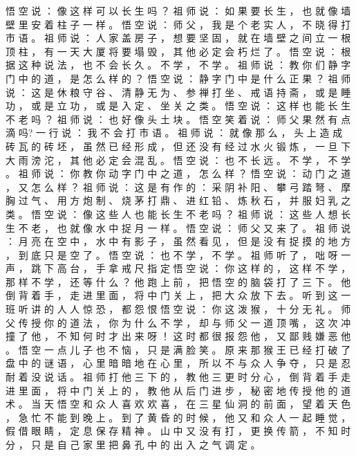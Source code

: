 {悟 空 说 ： 像 这 样 可 以 长 生 吗 ？ 祖 师 说 ： 如 果 要 长 生 ， 也 就 像 墙 壁 里 安 着 柱 子 一 样 。
悟 空 说 ： 师 父 ， 我 是 个 老 实 人 ， 不 晓 得 打 市 语 。
祖 师 说 ： 人 家 盖 房 子 ， 想 要 坚 固 ， 就 在 墙 壁 之 间 立 一 根 顶 柱 ， 有 一 天 大 厦 将 要 塌 毁 ， 其 他 必 定 会 朽 烂 了 。
悟 空 说 ： 根 据 这 种 说 法 ， 也 不 会 长 久 。
不 学 ， 不 学 。
祖 师 说 ： 教 你 们 静 字 门 中 的 道 ， 是 怎 么 样 的 ？ 悟 空 说 ： 静 字 门 中 是 什 么 正 果 ？ 祖 师 说 ： 这 是 休 粮 守 谷 、 清 静 无 为 、 参 禅 打 坐 、 戒 语 持 斋 ， 或 是 睡 功 ， 或 是 立 功 ， 或 是 入 定 、 坐 关 之 类 。
悟 空 说 ： 这 样 也 能 长 生 不 老 吗 ？ 祖 师 说 ： 也 好 像 头 土 块 。
悟 空 笑 着 说 ： 师 父 果 然 有 点 滴 吗?
一 行 说 ： 我 不 会 打 市 语 。
祖 师 说 ： 就 像 那 么 ， 头 上 造 成 砖 瓦 的 砖 坯 ， 虽 然 已 经 形 成 ， 但 还 没 有 经 过 水 火 锻 炼 ， 一 旦 下 大 雨 滂 沱 ， 其 他 必 定 会 混 乱 。
悟 空 说 ： 也 不 长 远 。
不 学 ， 不 学 。
祖 师 说 ： 你 教 你 动 字 门 中 之 道 ， 怎 么 样 ？ 悟 空 说 ： 动 门 之 道 ， 又 怎 么 样 ？ 祖 师 说 ： 这 是 有 作 的 ： 采 阴 补 阳 、 攀 弓 踏 弩 、 摩 胸 过 气 、 用 方 炮 制 、 烧 茅 打 鼎 、 进 红 铅 、 炼 秋 石 ， 并 服 妇 乳 之 类 。
悟 空 说 ： 像 这 些 人 也 能 长 生 不 老 吗 ？ 祖 师 说 ： 这 些 人 想 长 生 不 老 ， 也 就 像 水 中 捉 月 一 样 。
悟 空 说 ： 师 父 又 来 了 。
祖 师 说 ： 月 亮 在 空 中 ， 水 中 有 影 子 ， 虽 然 看 见 ， 但 是 没 有 捉 摸 的 地 方 ， 到 底 只 是 空 了 。
悟 空 说 ： 也 不 学 ， 不 学 。
祖 师 听 了 ， 咄 呀 一 声 ， 跳 下 高 台 ， 手 拿 戒 尺 指 定 悟 空 说 ： 你 这 样 的 ， 这 样 不 学 ， 那 样 不 学 ， 还 等 什 么 ？ 他 跑 上 前 ， 把 悟 空 的 脑 袋 打 了 三 下 。
他 倒 背 着 手 ， 走 进 里 面 ， 将 中 门 关 上 ， 把 大 众 放 下 去 。
听 到 这 一 班 听 讲 的 人 人 惊 恐 ， 都 怨 恨 悟 空 说 ： 你 这 泼 猴 ， 十 分 无 礼 。
师 父 传 授 你 的 道 法 ， 你 为 什 么 不 学 ， 却 与 师 父 一 道 顶 嘴 ， 这 次 冲 撞 了 他 ， 不 知 何 时 才 出 来 呀 ！ 这 时 都 很 报 怨 他 ， 又 鄙 贱 嫌 恶 他 。
悟 空 一 点 儿 子 也 不 恼 ， 只 是 满 脸 笑 。
原 来 那 猴 王 已 经 打 破 了 盘 中 的 谜 语 ， 心 里 暗 暗 地 在 心 里 ， 所 以 不 与 众 人 争 夺 ， 只 是 忍 耐 着 没 说 话 。
祖 师 打 他 三 下 的 ， 教 他 三 更 时 分 心 ， 倒 背 着 手 走 进 里 面 ， 将 中 门 关 上 的 ， 教 他 从 后 门 进 步 ， 秘 密 地 传 授 他 的 道 术 。
当 天 悟 空 和 众 人 喜 欢 欢 喜 ， 在 三 星 仙 洞 的 前 面 ， 望 着 天 色 ， 急 忙 不 能 到 晚 上 。
到 了 黄 昏 的 时 候 ， 他 又 和 众 人 一 起 睡 觉 ， 假 借 眼 睛 ， 定 息 保 存 精 神 。
山 中 又 没 有 打 ， 更 换 传 箭 ， 不 知 时 分 ， 只 是 自 己 家 里 把 鼻 孔 中 的 出 入 之 气 调 定 。
}
